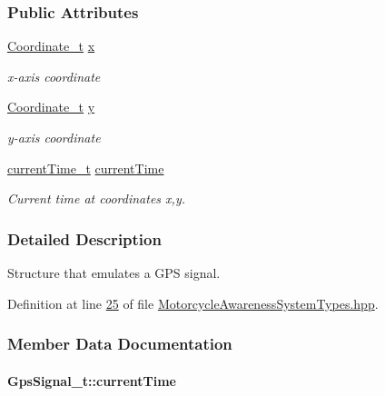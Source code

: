\subsubsection*{Public Attributes}
\begin{DoxyCompactItemize}
\item 
\hyperlink{MotorcycleAwarenessSystemTypes_8hpp_ae989615510617e9b0ad39dcd343c78fb}{Coordinate\-\_\-t} \hyperlink{structGpsSignal__t_a6f7bd3c500b55923ab335ada4b6b26eb}{x}
\begin{DoxyCompactList}\small\item\em x-\/axis coordinate \end{DoxyCompactList}\item 
\hyperlink{MotorcycleAwarenessSystemTypes_8hpp_ae989615510617e9b0ad39dcd343c78fb}{Coordinate\-\_\-t} \hyperlink{structGpsSignal__t_ab9e083be189fc842ed7aa4fdc978e94e}{y}
\begin{DoxyCompactList}\small\item\em y-\/axis coordinate \end{DoxyCompactList}\item 
\hyperlink{MotorcycleAwarenessSystemTypes_8hpp_a75ae168a2dad22557428f696df806a76}{current\-Time\-\_\-t} \hyperlink{structGpsSignal__t_abc96245129f39c6e51e8bfe955f2047e}{current\-Time}
\begin{DoxyCompactList}\small\item\em Current time at coordinates x,y. \end{DoxyCompactList}\end{DoxyCompactItemize}


\subsubsection{Detailed Description}
Structure that emulates a G\-P\-S signal. 

Definition at line \hyperlink{MotorcycleAwarenessSystemTypes_8hpp_source_l00025}{25} of file \hyperlink{MotorcycleAwarenessSystemTypes_8hpp_source}{Motorcycle\-Awareness\-System\-Types.\-hpp}.



\subsubsection{Member Data Documentation}
\hypertarget{structGpsSignal__t_abc96245129f39c6e51e8bfe955f2047e}{
\paragraph[{current\-Time}]{ Gps\-Signal\-\_\-t\-::current\-Time}}\label{structGpsSignal__t_abc96245129f39c6e51e8bfe955f2047e}


